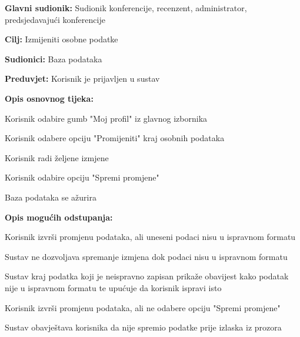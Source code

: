 					\noindent {}
					\begin{packed_item}
	
						\item \textbf{Glavni sudionik: } Sudionik konferencije, recenzent, administrator, predsjedavajući konferencije
						\item  \textbf{Cilj:} Izmijeniti osobne podatke
						\item  \textbf{Sudionici:} Baza podataka
						\item  \textbf{Preduvjet:} Korisnik je prijavljen u sustav
						\item  \textbf{Opis osnovnog tijeka:}
						
						\item[] \begin{packed_enum}
							\item Korisnik odabire gumb "Moj profil" iz glavnog izbornika
							\item Korisnik odabere opciju "Promijeniti" kraj osobnih podataka
							\item Korisnik radi željene izmjene
							\item Korisnik odabire opciju "Spremi promjene"
							\item Baza podataka se ažurira
					
						\end{packed_enum}

						\item  \textbf{Opis mogućih odstupanja:}
						
						\item[] \begin{packed_item}
	
							\item[2.a]  Korisnik izvrši promjenu podataka, ali uneseni podaci nisu u ispravnom formatu
							\item[] \begin{packed_enum}
								
								\item Sustav ne dozvoljava spremanje izmjena dok podaci nisu u ispravnom formatu
								\item Sustav kraj podatka koji je neispravno zapisan prikaže obavijest kako podatak nije u ispravnom formatu te upućuje da korisnik ispravi isto
								
							\end{packed_enum}

							\item[2.b]  Korisnik izvrši promjenu podataka, ali ne odabere opciju "Spremi promjene"
							\item[] \begin{packed_enum}
								
								\item Sustav obavještava korisnika da nije spremio podatke prije izlaska iz prozora
								
							\end{packed_enum}
							
						\end{packed_item}
			
					\end{packed_item}

